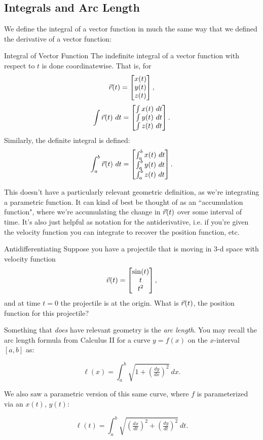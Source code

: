 \subsection{Integrals and Arc Length}

We define the integral of a vector function in much the same way that we defined the derivative of a vector function:

\begin{definition}{Integral of Vector Function}
The indefinite integral of a vector function with respect to $t$ is done coordinatewise. That is, for $$\vec{r}(t)=\begin{bmatrix}x(t)\\y(t)\\z(t)\end{bmatrix}, $$
$$\int \vec{r}(t) \ dt=\begin{bmatrix}\int x(t)\ dt\\ \int y(t)\ dt\\ \int z(t)\ dt\end{bmatrix}. $$
Similarly, the definite integral is defined:
$$\int_a^b \vcr(t) \ dt=\bmat{\int_a^b x(t)\ dt\\ \int_a^b y(t)\ dt\\ \int_a^b z(t)\ dt}. $$
\end{definition}

This doesn't have a particularly relevant geometric definition, as we're integrating a parametric function. It can kind of best be thought of as an ``accumulation function", where we're accumulating the change in $\vec{r}(t)$ over some interval of time. It's also just helpful as notation for the antiderivative, i.e. if you're given the velocity function you can integrate to recover the position function, etc.

\begin{exercise}{Antidifferentiating}
Suppose you have a projectile that is moving in 3-d space with velocity function $$\vec{v}(t)=\begin{bmatrix}\sin(t)\\t\\t^2\end{bmatrix},$$ and at time $t=0$ the projectile is at the origin. What is $\vec{r}(t)$, the position function for this projectile?
\end{exercise}

Something that \textit{does} have relevant geometry is the \textit{arc length}. You may recall the arc length formula from Calculus II for a curve $y=f(x)$ on the $x$-interval $[a,b]$ as:

$$\ell(x)=\int_{a}^{b} \sqrt{1+\left(\tfrac{dy}{dx}\right)^2} \ dx. $$

We also saw a parametric version of this same curve, where $f$ is parameterized via an $x(t)$, $y(t)$:

$$\ell(t)=\int_{a}^{b} \sqrt{\left(\tfrac{dx}{dt}\right)^2+\left(\tfrac{dy}{dt}\right)^2}\ dt. $$

